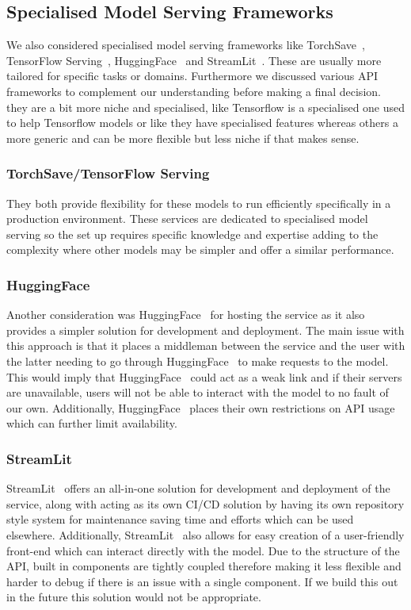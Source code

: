 \documentclass{surreydissertation}
\begin{document}
\subsection{Specialised Model Serving Frameworks}
We also considered specialised model serving frameworks like TorchSave~\cite{TorchSave}, TensorFlow Serving~\cite{tensorflow}, HuggingFace~\cite{huggingface} and StreamLit~\cite{streamlit}. These are usually more tailored for specific tasks or domains. Furthermore we discussed various API frameworks to complement our understanding before making a final decision. they are a bit more niche and specialised, like Tensorflow is a specialised one used to help Tensorflow models or like they have specialised features whereas others a more generic and can be more flexible but less niche if that makes sense. 

\subsubsection{TorchSave/TensorFlow Serving}
They both provide flexibility for these models to run efficiently specifically in a production environment. These services are dedicated to specialised model serving so the set up requires specific knowledge and expertise adding to the complexity where other models may be simpler and offer a similar performance.

\subsubsection{HuggingFace}
Another consideration was HuggingFace~\cite{huggingface} for hosting the service as it also provides a simpler solution for development and deployment. The main issue with this approach is that it places a middleman between the service and the user with the latter needing to go through HuggingFace~\cite{huggingface} to make requests to the model. This would imply that HuggingFace~\cite{huggingface} could act as a weak link and if their servers are unavailable, users will not be able to interact with the model to no fault of our own. Additionally, HuggingFace~\cite{huggingface} places their own restrictions on API usage which can further limit availability.

\subsubsection{StreamLit}
StreamLit~\cite{streamlit} offers an all-in-one solution for development and deployment of the service, along with acting as its own CI/CD solution by having its own repository style system for maintenance saving time and efforts which can be used elsewhere. Additionally, StreamLit~\cite{streamlit} also allows for easy creation of a user-friendly front-end which can interact directly with the model. Due to the structure of the API, built in components are tightly coupled therefore making it less flexible and harder to debug if there is an issue with a single component. If we build this out in the future this solution would not be appropriate.
\end{document}
